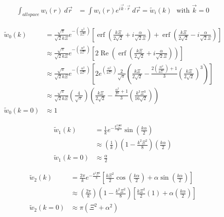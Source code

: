 \documentclass[double,12pt]{beavtex}
\begin{document}
\begin{align}
   \int_{all space} w_i(r) ~d\vec r &= \int w_i(r)e^{i\vec k \cdot 
   \vec r}~d\vec r 
    = \widetilde{w}_i(k) \mbox{~~with $\vec k = 0$}
\end{align}

\begin{align}
    \widetilde{w}_0(k) &= \frac{\sqrt{\pi}}{\sqrt{2}k\Xi}e^{-\left(
    \frac{\alpha^2}{2\Xi^2}\right)}\left[\operatorname{erf}
    \left(\frac{k\Xi}{2\sqrt{2}}+i\frac{\alpha}{\sqrt{2}\Xi}\right)
    +\operatorname{erf}\left(\frac{k\Xi}{2\sqrt{2}}-i\frac{\alpha}
    {\sqrt{2}\Xi}\right)\right] \\
    & \approx   \frac{\sqrt{\pi}}{\sqrt{2}k\Xi}e^{-\left(\frac{\alpha^2}
    {2\Xi^2}\right)}\left[2\operatorname{Re}\left(\operatorname{erf}
    \left(\frac{k\Xi}{2\sqrt{2}}+i\frac{\alpha}{\sqrt{2}\Xi}\right)
    \right)\right] \\
    & \approx   \frac{\sqrt{\pi}}{\sqrt{2}k\Xi}e^{-\left(\frac{\alpha^2}
    {2\Xi^2}\right)}\left[2e^{\left(\frac{\alpha^2}{2\Xi^2}\right)}
    \frac{2}{\sqrt{\pi}}\left(\frac{k\Xi}{2\sqrt{2}} -\frac{2\left(
    \frac{\alpha^2}{2\Xi^2}\right)+1}{3}\left(\frac{k\Xi}{2\sqrt{2}}
    \right)^3\right)\right] \\
    & \approx   \frac{\sqrt{\pi}}{\sqrt{2}k\Xi}\left(\frac{4}{\sqrt{\pi}}
    \right)\left(\frac{k\Xi}{2\sqrt{2}} -\frac{\frac{\alpha^2}{\Xi^2}+1}
    {3}\left(\frac{k^3\Xi^3}{16\sqrt{2}}\right)\right) \\
     \widetilde{w}_0(k=0) & \approx 1
\end{align}

\begin{align}
    \widetilde{w}_1(k) &= \frac{1}{k}e^{-\frac{k^2\Xi^2}{8}}
    \sin\left(\frac{k\alpha}{2}\right)  \\
  & \approx\left(\frac{1}{k}\right)\left(1-\frac{k^2\Xi^2}{8}\right)
  \left(\frac{k\alpha}{2}\right)  \\
  \widetilde{w}_1(k=0) & \approx\frac{\alpha}{2}
\end{align}

\begin{align}
     \widetilde{w}_2(k) &= \frac{2\pi}{k}e^{-\frac{k^2\Xi^2}{8}}
       \left[\frac{k\Xi^2}{2}\cos\left(\frac{k\alpha}{2}\right)
       +\alpha\sin\left(\frac{k\alpha}{2}\right)\right] \\
       &  \approx\left(\frac{2\pi}{k}\right)\left(1-\frac{k^2\Xi^2}{8}
       \right)\left[\frac{k\Xi^2}{2}\left(1\right)+\alpha\left(
       \frac{k\alpha}{2}\right)\right] \\
       \widetilde{w}_2(k=0) & \approx \pi(\Xi^2 + \alpha^2)
\end{align}
\end{document}
